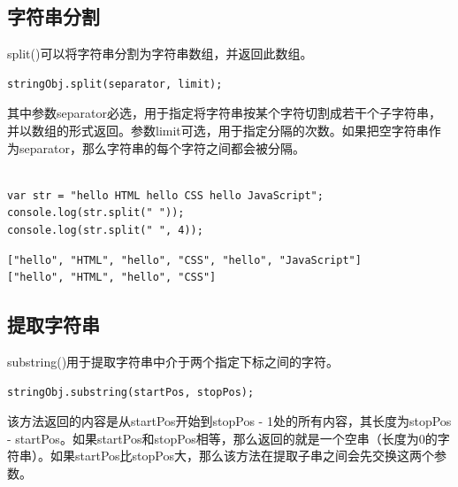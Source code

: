 \subsection{字符串分割}

split()可以将字符串分割为字符串数组，并返回此数组。 \\

\begin{lstlisting}[style=htmlcssjs]
stringObj.split(separator, limit);
\end{lstlisting}

其中参数separator必选，用于指定将字符串按某个字符切割成若干个子字符串，并以数组的形式返回。参数limit可选，用于指定分隔的次数。如果把空字符串作为separator，那么字符串的每个字符之间都会被分隔。 \\

 \\

\begin{lstlisting}[style=htmlcssjs]
var str = "hello HTML hello CSS hello JavaScript";
console.log(str.split(" "));
console.log(str.split(" ", 4));
\end{lstlisting}

\begin{tcolorbox}
	\begin{verbatim}
["hello", "HTML", "hello", "CSS", "hello", "JavaScript"]
["hello", "HTML", "hello", "CSS"]
	\end{verbatim}
\end{tcolorbox}

\subsection{提取字符串}

substring()用于提取字符串中介于两个指定下标之间的字符。 \\

\begin{lstlisting}[style=htmlcssjs]
stringObj.substring(startPos, stopPos);
\end{lstlisting}

该方法返回的内容是从startPos开始到stopPos - 1处的所有内容，其长度为stopPos - startPos。如果startPos和stopPos相等，那么返回的就是一个空串（长度为0的字符串）。如果startPos比stopPos大，那么该方法在提取子串之间会先交换这两个参数。 \\

 \\

